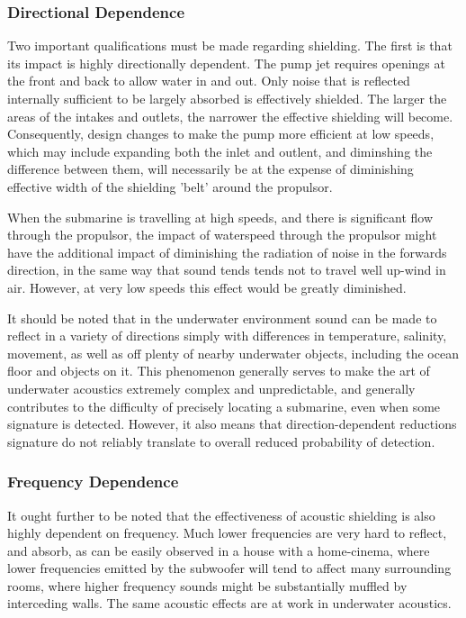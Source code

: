 \documentclass{article}\usepackage[]{graphicx}\usepackage[]{color}
\begin{document}
\subsubsection{Directional Dependence}
Two important qualifications must be made regarding shielding.  The first is that its impact is highly directionally dependent.  The pump jet requires openings at the front and back to allow water in and out. Only noise that is reflected internally sufficient to be largely absorbed is effectively shielded.  The larger the areas of the intakes and outlets, the narrower the effective shielding will become.  Consequently, design changes to make the pump more efficient at low speeds, which may include expanding both the inlet and outlent, and diminshing the difference between them, will necessarily be at the expense of diminishing effective width of the shielding 'belt' around the propulsor.

When the submarine is travelling at high speeds, and there is significant flow through the propulsor, the impact of waterspeed through the propulsor might have the additional impact of diminishing the radiation of noise in the forwards direction, in the same way that sound tends tends not to travel well up-wind in air.  However, at very low speeds this effect would be greatly diminished.

It should be noted that in the underwater environment sound can be made to reflect in a variety of directions simply with differences in temperature, salinity, movement, as well as off plenty of nearby underwater objects, including the ocean floor and objects on it.  This phenomenon generally serves to make the art of underwater acoustics extremely complex and unpredictable, and generally contributes to the difficulty of precisely locating a submarine, even when some signature is detected.  However, it also means that direction-dependent reductions signature do not reliably translate to overall reduced probability of detection.

\subsubsection{Frequency Dependence}
It ought further to be noted that the effectiveness of acoustic shielding is also highly dependent on frequency.  Much lower frequencies are very hard to reflect, and absorb, as can be easily observed in a house with a home-cinema, where lower frequencies emitted by the subwoofer will tend to affect many surrounding rooms, where higher frequency sounds might be substantially muffled by interceding walls. The same acoustic effects are at work in underwater acoustics.
\end{document}
